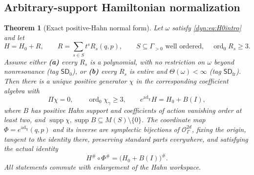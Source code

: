\documentclass[11pt,letterpaper]{article}
\newtheorem{theorem}{Theorem}[section]
\theoremstyle{definition}
\theoremstyle{remark}
\newcommand{\OO}{\mathcal O}
\newcommand{\supp}{\operatorname{supp}}
\newcommand{\ord}{\operatorname{ord}}
\newcommand{\ad}{\operatorname{ad}}
\newcommand{\sdz}{\mathsf{SD}_{0}}
\newcommand{\sdfr}{\mathsf{SD}_{\mathrm{fr}}}
\numberwithin{equation}{section}
\begin{document}
\subsection{Arbitrary-support Hamiltonian normalization}

\begin{theorem}[Exact positive-Hahn normal form]\label{dyn:thm:normalform}
Let $\omega$ satisfy \eqref{dyn:eq:H0intro} and let
\begin{equation}\label{dyn:eq:Hinput}
 H=H_0+R,\qquad R=\sum_{s\in S}t^{s}R_s(q,p),\qquad
 S\subseteq\Gamma_{>0}\text{ well ordered},\quad \ord_0R_s\ge3 .
\end{equation}
Assume either
\textbf{(a)} every $R_s$ is a polynomial, with \emph{no} restriction on
$\omega$ beyond nonresonance (tag $\sdz$), or
\textbf{(b)} every $R_s$ is entire and $\Theta(\omega)<\infty$ (tag
$\sdfr$). Then there is a \emph{unique} positive generator $\chi$ in the
corresponding coefficient algebra with
\begin{equation}\label{dyn:eq:gauge}
 \Pi\chi=0,\qquad \ord_0\chi_\gamma\ge3,\qquad
 e^{\ad_\chi}H=H_0+B(I),
\end{equation}
where $B$ has positive Hahn support and coefficients of action vanishing
order at least two, and $\supp\chi,\supp B\subseteq M(S)\setminus\{0\}$.
The coordinate map $\Phi=e^{\ad_\chi}(q,p)$ and its inverse are symplectic
bijections of $\OO_\Gamma^{2d}$, fixing the origin, tangent to the identity
there, preserving standard parts everywhere, and satisfying the actual
identity
\begin{equation}\label{dyn:eq:actualnormal}
 H^{\#}\circ\Phi^{\#}=\bigl(H_0+B(I)\bigr)^{\#}.
\end{equation}
All statements commute with enlargement of the Hahn workspace.
\end{theorem}
\end{document}
